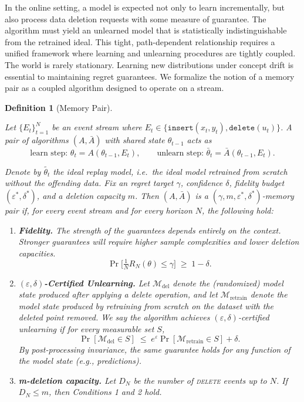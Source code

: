 \documentclass{article}
\theoremstyle{ssltheorem}
\newtheorem{definition}{Definition}
\begin{document}
In the online setting, a model is expected not only to learn incrementally, but also process data deletion requests with some measure of guarantee.
The algorithm must yield an unlearned model that is statistically indistinguishable from the retrained ideal.
This tight, path-dependent relationship requires a unified framework where learning and unlearning procedures are tightly coupled.
The world is rarely stationary. Learning new distributions under concept drift is essential to maintaining regret guarantees.
We formalize the notion of a memory pair as a coupled algorithm designed to operate on a stream.
\begin{definition}[Memory Pair]
\label{def:memory-pair}

Let $\{E_{t}\}_{t=1}^{N}$ be an event stream where $E_{t}\in \{\texttt{insert}(x_{t},y_{t}),\texttt{delete}(u_{t})\}$.
A pair of algorithms $(A,\bar{A})$ with shared state $\theta_{t-1}$ acts as
$$
\text{learn step: }\theta_{t} = A(\theta_{t-1},E_{t}),\qquad
\text{unlearn step: }\bar\theta_{t} = \bar{A}(\theta_{t-1},E_{t}).
$$

Denote by $\tilde{\theta_{t}}$ the {\it ideal replay model}, i.e.\ the ideal model retrained from scratch without the offending data.
Fix an regret target $\gamma$, confidence $\delta$, fidelity budget
$(\varepsilon^{*},\delta^{*})$, and a deletion capacity
$m$.
Then $(A,\bar{A})$ is a
\emph{$(\gamma,m,\varepsilon^{*},\delta^{*})$-memory pair} if, for every
event stream and for every horizon $N$, the following hold:

\begin{enumerate}
\item \textbf{Fidelity.} The strength of the guarantees depends entirely on the context.
Stronger guarantees will require higher sample complexities and lower deletion capacities.
      $$
      \Pr\!\bigl[\tfrac{1}{N} R_{N}(\theta)\le\gamma\bigr]\;\ge\;1-\delta.
$$

\item \textbf{$(\varepsilon, \delta)$-Certified Unlearning.}  
    Let $\mathcal{M}_{\text{del}}$ denote the (randomized) model state produced after applying a delete operation,
    and let $\mathcal{M}_{\text{retrain}}$ denote the model state produced by retraining from scratch on the dataset with
    the deleted point removed.
We say the algorithm achieves $(\varepsilon,\delta)$\emph{-certified unlearning}
    if for every measurable set $S$,
    \[
    \Pr[\mathcal{M}_{\text{del}}\in S] \;\le\;
e^{\varepsilon}\Pr[\mathcal{M}_{\text{retrain}}\in S] + \delta.
    \]
    By post-processing invariance, the same guarantee holds for any function of the model state (e.g., predictions).
\item \textbf{m-deletion capacity.}  
      Let $D_{N}$ be the number of \textsc{delete} events up to $N$.
If $D_{N}\le m$, then Conditions 1 and 2 hold.
\end{enumerate}
\end{definition}
\end{document}
